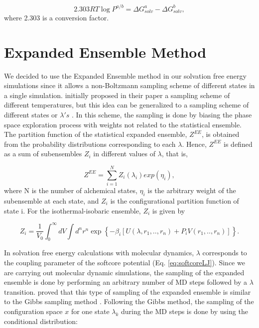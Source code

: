 \begin{equation}
\label{eqn:partcoe}
{2.303RT} \log{P}^{a/b} ={\Delta G_{solv}^{a} - \Delta G_{solv}^{b}},
\end{equation}
where 2.303 is a conversion factor.

\section{Expanded Ensemble Method}\label{ee}

We decided to use the Expanded Ensemble method \cite{lyubartsev} in our solvation free energy simulations since it allows a non-Boltzmann sampling scheme of different states in a single simulation.  initially proposed in their paper a sampling scheme of different temperatures, but this idea can be generalized to a sampling scheme of different states or $\lambda 's$ \cite{escobedo2007}. In this scheme, the sampling is done by biasing the phase space exploration process with weights not related to the statistical ensemble. The partition function of the statistical expanded ensemble, $Z^{EE}$, is obtained from the probability distributions corresponding to each $\lambda$. Hence, $Z^{EE}$ is defined as a sum of subensembles $Z_{i}$ in different values of $\lambda$, that is,

\begin{equation}
Z^{EE} = \sum_{i=1}^{N} Z_{i}(\lambda_{i}) exp(\eta_{i}),
\label{eqn:ee}
\end{equation}   
where N is the number of alchemical states, $\eta_{i}$ is the arbitrary weight of the subensemble at each state, and $Z_{i}$ is the configurational partition function of state i. For the isothermal-isobaric ensemble, $Z_{i}$ is given by

\begin{equation}
Z_{i} = \frac{1}{V_{0}} {\int_{0}^{\infty} dV \int d^{n}r^{n} \exp \left \lbrace -\beta_{i} \left[ U(\lambda, r_{1},..,r_{n}) + P_{i}V(r_{1},..,r_{n}) \right] \right \rbrace}.
\end{equation} 

In solvation free energy calculations with molecular dynamics, $\lambda$ corresponds to the coupling parameter of the softcore potential (Eq. \ref{eq:softcoreLJ}). Since we are carrying out molecular dynamic simulations, the sampling of the expanded ensemble is done by performing an arbitrary number of MD  steps followed by a $\lambda$ transition.  proved that this type of sampling of the expanded ensemble is similar to the Gibbs sampling method \cite{geman1984,liu2002}. Following the Gibbs method, the sampling of the configuration space $x$ for one state $\lambda_{k}$ during the MD steps is done by using the conditional distribution:

